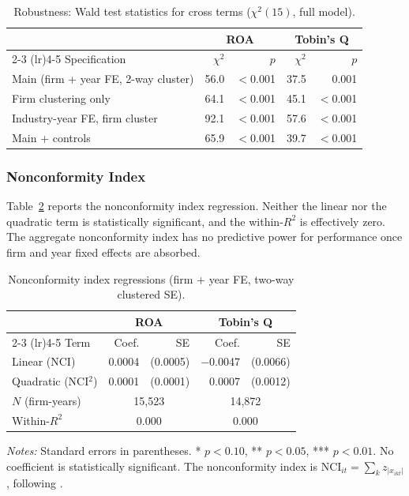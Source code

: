 \documentclass[12pt]{article}
\begin{document}
\begin{table}[htbp]
\centering
\caption{Robustness: Wald test statistics for cross terms ($\chi^2(15)$, full model).}
\label{tab:robustness}
\begin{tabular}{lrrrr}
\toprule
 & \multicolumn{2}{c}{ROA} & \multicolumn{2}{c}{Tobin's Q} \\
\cmidrule(lr){2-3} \cmidrule(lr){4-5}
Specification & $\chi^2$ & $p$ & $\chi^2$ & $p$ \\
\midrule
Main (firm + year FE, 2-way cluster)     & 56.0 & $<$0.001 & 37.5 & 0.001 \\
Firm clustering only                      & 64.1 & $<$0.001 & 45.1 & $<$0.001 \\
Industry-year FE, firm cluster            & 92.1 & $<$0.001 & 57.6 & $<$0.001 \\
Main + controls                           & 65.9 & $<$0.001 & 39.7 & $<$0.001 \\
\bottomrule
\end{tabular}
\end{table}

\subsubsection{Nonconformity Index}

Table~\ref{tab:nonconformity} reports the nonconformity index regression. Neither the linear nor the quadratic term is statistically significant, and the within-$R^2$ is effectively zero. The aggregate nonconformity index has no predictive power for performance once firm and year fixed effects are absorbed.

\begin{table}[htbp]
\centering
\caption{Nonconformity index regressions (firm + year FE, two-way clustered SE).}
\label{tab:nonconformity}
\begin{tabular}{lrrrr}
\toprule
 & \multicolumn{2}{c}{ROA} & \multicolumn{2}{c}{Tobin's Q} \\
\cmidrule(lr){2-3} \cmidrule(lr){4-5}
Term & Coef. & SE & Coef. & SE \\
\midrule
Linear (NCI)          &  0.0004 & (0.0005) & $-$0.0047  & (0.0066) \\
Quadratic (NCI$^2$)   &  0.0001 & (0.0001) &  0.0007  & (0.0012) \\
\midrule
$N$ (firm-years) & \multicolumn{2}{c}{15,523} & \multicolumn{2}{c}{14,872} \\
Within-$R^2$     & \multicolumn{2}{c}{0.000}  & \multicolumn{2}{c}{0.000} \\
\bottomrule
\end{tabular}

\smallskip
\footnotesize\textit{Notes:} Standard errors in parentheses. * $p < 0.10$, ** $p < 0.05$, *** $p < 0.01$. No coefficient is statistically significant. The nonconformity index is $\text{NCI}_{it} = \sum_k z_{|x_{ikt}|}$, following \citet{miller2013}.
\end{table}
\end{document}
